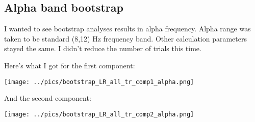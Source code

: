 \documentclass{article}
\begin{document}
\subsection{Alpha band bootstrap}
I wanted to see bootstrap analyses results in alpha frequency.
Alpha range was taken to be standard (8,12) Hz frequency band.
Other calculation parameters stayed the same. 
I didn't reduce the number of trials this time.

Here's what I got for the first component:

\texttt{[image: ../pics/bootstrap\_LR\_all\_tr\_comp1\_alpha.png]}

And the second component:

\texttt{[image: ../pics/bootstrap\_LR\_all\_tr\_comp2\_alpha.png]}
\end{document}
